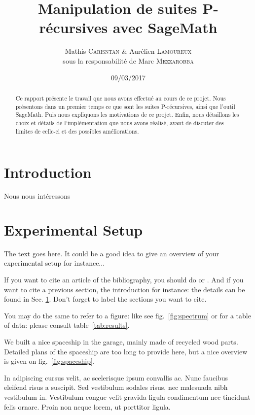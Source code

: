 \documentclass[final,12pt]{article}
\begin{document}
%
\title{Manipulation de suites P-récursives avec SageMath}
\author{Mathis \textsc{Carisntan} \& Aurélien \textsc{Lamoureux} \\ {\small sous la responsabilité de Marc \textsc{Mezzarobba}}}
%
\date{09/03/2017}

\maketitle
%
\begin{abstract}
    Ce rapport présente le travail que nous avons effectué au cours de ce projet.
    Nous présentons dans un premier temps ce que sont les suites P-récursives,
    ainsi que l'outil SageMath. Puis nous expliquons les motivations de ce projet.
    Enfin, nous détaillons les choix et détails de l'implémentation que nous avons réalisé,
    avant de discuter des limites de celle-ci et des possibles améliorations.
\end{abstract}

\section{Introduction}
    \label{intro}
    Nous nous intéressons

\section{Experimental Setup}

The text goes here. It could be a good idea to give an overview of your
experimental setup for instance...

If you want to cite an article of the bibliography, you should do
\cite{ipn-web} or \cite{Boh}. And if you want to cite a previous
section, the introduction for instance: the details can be found in
Sec. \ref{intro}. Don't forget to label the sections you want to
cite. 

You may do the same to refer to a figure: like see fig.~\ref{fig:spectrum}
or for a table of data: please consult table~\ref{tab:results}.

We built a nice spaceship in the garage, mainly made of recycled 
wood parts. Detailed plans of the spaceship are too long to provide
here, but a nice overview is given on fig.~\ref{fig:spaceship}.

In adipiscing cursus velit, ac scelerisque ipsum convallis ac. Nunc
faucibus eleifend risus a suscipit. Sed vestibulum sodales risus, nec
malesuada nibh vestibulum in. Vestibulum congue velit gravida ligula
condimentum nec tincidunt felis ornare. Proin non neque lorem, ut
porttitor ligula. 
\end{document}
